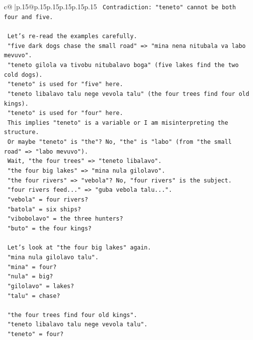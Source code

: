 \documentclass{article}
\begin{document}
{\begin{supertabular}{c@{$\;$}|p{.15\linewidth}@{}p{.15\linewidth}p{.15\linewidth}p{.15\linewidth}p{.15\linewidth}p{.15\linewidth}}
{{{\texttt{   Contradiction: "teneto" cannot be both four and five.} \\
\\ 
\texttt{   Let's re{-}read the examples carefully.} \\
\texttt{   "five dark dogs chase the small road" => "mina nena nitubala va labo mevuvo".} \\
\texttt{   "teneto gilola va tivobu nitubalavo boga" (five lakes find the two cold dogs).} \\
\texttt{   "teneto" is used for "five" here.} \\
\texttt{   "teneto libalavo talu nege vevola talu" (the four trees find four old kings).} \\
\texttt{   "teneto" is used for "four" here.} \\
\texttt{   This implies "teneto" is a variable or I am misinterpreting the structure.} \\
\texttt{   Or maybe "teneto" is "the"? No, "the" is "labo" (from "the small road" => "labo mevuvo").} \\
\texttt{   Wait, "the four trees" => "teneto libalavo".} \\
\texttt{   "the four big lakes" => "mina nula gilolavo".} \\
\texttt{   "the four rivers" => "vebola"? No, "four rivers" is the subject.} \\
\texttt{   "four rivers feed..." => "guba vebola talu...".} \\
\texttt{   "vebola" = four rivers?} \\
\texttt{   "batola" = six ships?} \\
\texttt{   "vibobolavo" = the three hunters?} \\
\texttt{   "buto" = the four kings?} \\
\\ 
\texttt{   Let's look at "the four big lakes" again.} \\
\texttt{   "mina nula gilolavo talu".} \\
\texttt{   "mina" = four?} \\
\texttt{   "nula" = big?} \\
\texttt{   "gilolavo" = lakes?} \\
\texttt{   "talu" = chase?} \\
\\ 
\texttt{   "the four trees find four old kings".} \\
\texttt{   "teneto libalavo talu nege vevola talu".} \\
\texttt{   "teneto" = four?} \\
}}}
\end{supertabular}}
\end{document}
